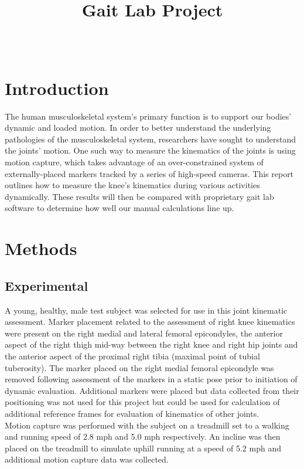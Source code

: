 \documentclass[10pt]{IEEEtran}
\title{Gait Lab Project}
\author{
    \IEEEauthorblockN{John Hanlon} \IEEEauthorblockA{UF College of Veterinary Medicine} \\
    \and \IEEEauthorblockN{Andrew Jensen} \IEEEauthorblockA{UF College of Engineering}
}
\begin{document}
\maketitle
    \section{Introduction}
    The human musculoskeletal system's primary function is to support our bodies' dynamic and loaded motion. In order to better understand the underlying pathologies of the musculoskeletal system, researchers have sought to understand the joints' motion. One such way to measure the kinematics of the joints is using motion capture, which takes advantage of an over-constrained system of externally-placed markers tracked by a series of high-speed cameras. This report outlines how to measure the knee's kinematics during various activities dynamically. These results will then be compared with proprietary gait lab software to determine how well our manual calculations line up.

    \section{Methods}
    \subsection{Experimental}
    A young, healthy, male test subject was selected for use in this joint kinematic assessment. Marker placement related to the assessment of right knee kinematics were present on the right medial and lateral femoral epicondyles, the anterior aspect of the right thigh mid-way between the right knee and right hip joints and the anterior aspect of the proximal right tibia (maximal point of tubial tuberosity). The marker placed on the right medial femoral epicondyle was removed following assessment of the markers in a static pose prior to initiation of dynamic evaluation. Additional markers were placed but data collected from their positioning was not used for this project but could be used for calculation of additional reference frames for evaluation of kinematics of other joints. \\
    Motion capture was performed with the subject on a treadmill set to a walking and running speed of 2.8 mph and 5.0 mph respectively. An incline was then placed on the treadmill to simulate uphill running at a speed of 5.2 mph and additional  motion capture data was collected. 
\end{document}
